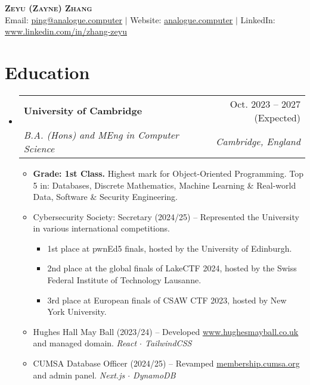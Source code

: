 \documentclass[letterpaper,10pt]{article}
\makeatletter
\newcommand{\link}[2]{\href{#1}{\color{blue}\underline{#2}}}
\newcommand{\resumeItem}[1]{
  \item\small{
    {#1 \vspace{-2pt}}
  }
}
\newcommand{\resumeSubheading}[4]{
  \vspace{-2pt}\item
  \begin{tabular*}{0.97\textwidth}[t]{l@{\extracolsep{\fill}}r}
    \textbf{#1} & #2 \\
    \textit{\small#3} & \textit{\small #4} \\
  \end{tabular*}\vspace{-7pt}
}
\newenvironment{resumeSubHeadingList}{\begin{itemize}[leftmargin=0.15in, label={}]}{\end{itemize}}
\newenvironment{resumeItemList}{\begin{itemize}}{\end{itemize}}
\newenvironment{resumeItemSubList}{\begin{itemize}\setlength\itemsep{0.4em}}{\end{itemize}\vspace{-5pt}}
\makeatother
\begin{document}
\begin{center}
  \textbf{\huge \scshape Zeyu (Zayne) Zhang} \\ \vspace{1pt}
  \small Email: \link{mailto:ping@analogue.computer}{ping@analogue.computer} $|$ Website: \link{https://www.analogue.computer}{analogue.computer} $|$ LinkedIn: \link{https://www.linkedin.com/in/zhang-zeyu}{www.linkedin.com/in/zhang-zeyu}
\end{center}

\section{Education}
\begin{resumeSubHeadingList}
  \resumeSubheading
    {University of Cambridge}{Oct. 2023 -- 2027 (Expected)}
    {B.A. (Hons) and MEng in Computer Science}{Cambridge, England}
    \begin{resumeItemList}
      \resumeItem{\textbf{Grade: 1st Class.}
        Highest mark for Object-Oriented Programming.
        Top 5 in: Databases, Discrete Mathematics, Machine Learning \& Real-world Data, Software \& Security Engineering.}

      \resumeItem{Cybersecurity Society: Secretary (2024/25) -- Represented the
                  University in various international competitions.}

        \begin{resumeItemSubList}
          \resumeItem{1st place at pwnEd5 finals, hosted by the University of Edinburgh.}
          \resumeItem{2nd place at the global finals of LakeCTF 2024, hosted by the Swiss Federal Institute of Technology Lausanne.}
          \resumeItem{3rd place at European finals of CSAW CTF 2023, hosted by New York University.}
        \end{resumeItemSubList}

      \resumeItem{Hughes Hall May Ball (2023/24) -- Developed \link{https://www.hughesmayball.co.uk}{www.hughesmayball.co.uk} and managed
       domain. \textit{React $\cdot$ TailwindCSS} }
      \resumeItem{CUMSA Database Officer (2024/25) -- Revamped \link{https://membership.cumsa.org/}{membership.cumsa.org} and admin panel.
       \textit{Next.js $\cdot$ DynamoDB} }
    \end{resumeItemList}
\end{resumeSubHeadingList}
\end{document}

